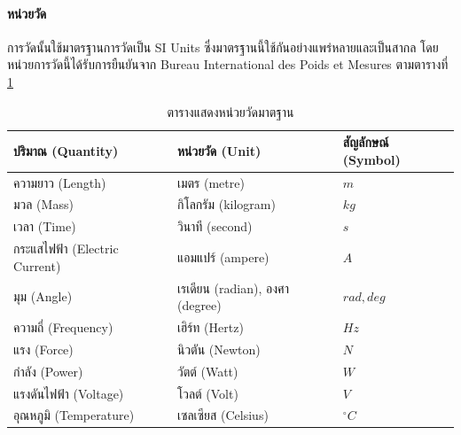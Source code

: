 \paragraph*{หน่วยวัด}
การวัดนั้นใช้มาตรฐานการวัดเป็น SI Units ซึ่งมาตรฐานนี้ใช้กันอย่างแพร่หลายและเป็นสากล โดยหน่วยการวัดนี้ได้รับการยืนยันจาก
Bureau International des Poids et Mesures ตามตารางที่ \ref{tab:standart_unit}

\begin{table}[!ht]
	\centering
	\begin{tabular}{| l | l | l |}
		\hline
		ปริมาณ (Quantity)                     & หน่วยวัด (Unit)                      & สัญลักษณ์ (Symbol) \\
		\hline
		ความยาว (Length)                    & เมตร (metre)                                 & $m$                                 \\
		มวล (Mass)                                  & กิโลกรัม (kilogram)                  & $kg$                                \\
		เวลา (Time)                               & วินาที (second)                          & $s$                                 \\
		กระแสไฟฟ้า (Electric Current) & แอมแปร์ (ampere)                       & $A$                                 \\
		มุม (Angle)                                 & เรเดียน (radian), องศา (degree) & $rad, deg$                          \\
		ความถี่ (Frequency)                 & เฮิร์ท (Hertz)                           & $Hz$                                \\
		แรง (Force)                                 & นิวตัน (Newton)                          & $N$                                 \\
		กำลัง (Power)                           & วัตต์ (Watt)                               & $W$                                 \\
		แรงดันไฟฟ้า (Voltage)       & โวลต์ (Volt)                               & $V$                                 \\
		อุณหภูมิ (Temperature)            & เซลเซียส (Celsius)                   & ${}^\circ C$                                 \\
		\hline
	\end{tabular}
	\caption{ตารางแสดงหน่วยวัดมาตฐาน}
	\label{tab:standart_unit}
\end{table}

